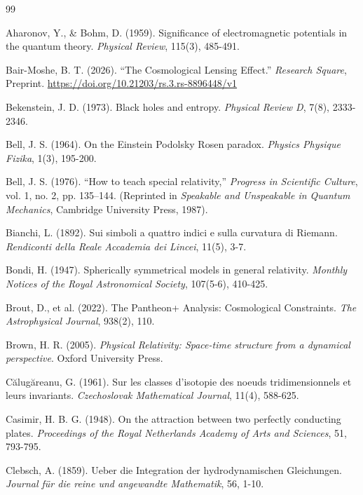 \begin{thebibliography}{99}

Aharonov, Y., \& Bohm, D. (1959). Significance of electromagnetic potentials in the quantum theory. \textit{Physical Review}, 115(3), 485-491.

Bair-Moshe, B. T. (2026).
``The Cosmological Lensing Effect.''
\textit{Research Square}, Preprint.
\url{https://doi.org/10.21203/rs.3.rs-8896448/v1}

Bekenstein, J. D. (1973). Black holes and entropy. \textit{Physical Review D}, 7(8), 2333-2346.

Bell, J. S. (1964). On the Einstein Podolsky Rosen paradox. \textit{Physics Physique Fizika}, 1(3), 195-200.

Bell, J. S. (1976). ``How to teach special relativity,'' \textit{Progress in Scientific Culture}, vol. 1, no. 2, pp. 135--144. (Reprinted in \textit{Speakable and Unspeakable in Quantum Mechanics}, Cambridge University Press, 1987).

Bianchi, L. (1892). Sui simboli a quattro indici e sulla curvatura di Riemann. \textit{Rendiconti della Reale Accademia dei Lincei}, 11(5), 3-7.

Bondi, H. (1947). Spherically symmetrical models in general relativity. \textit{Monthly Notices of the Royal Astronomical Society}, 107(5-6), 410-425.

Brout, D., et al. (2022). The Pantheon+ Analysis: Cosmological Constraints. \textit{The Astrophysical Journal}, 938(2), 110.

Brown, H. R. (2005). \textit{Physical Relativity: Space-time structure from a dynamical perspective}. Oxford University Press.

C\u{a}lug\u{a}reanu, G. (1961). Sur les classes d'isotopie des noeuds tridimensionnels et leurs invariants. \textit{Czechoslovak Mathematical Journal}, 11(4), 588-625.

Casimir, H. B. G. (1948). On the attraction between two perfectly conducting plates. \textit{Proceedings of the Royal Netherlands Academy of Arts and Sciences}, 51, 793-795.

Clebsch, A. (1859). Ueber die Integration der hydrodynamischen Gleichungen. \textit{Journal f\"{u}r die reine und angewandte Mathematik}, 56, 1-10.


\end{thebibliography}
